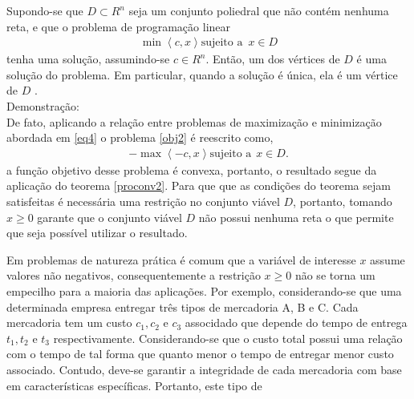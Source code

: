  	\begin{cor}%
	 	\label{cov2}
		Supondo-se que $D \subset R^n$ seja um conjunto poliedral que n\~ao cont\'em nenhuma reta, e que o problema de programa\c c\~ao 
		linear
	   \begin{align} 
		   \label {obj2}
		   \min \left<c,x\right> \mbox{sujeito a} \hspace{6pt}x \in D
	   \end{align}
	    tenha uma solu\c c\~ao, assumindo-se $c \in R^n$. Ent\~ao, um dos v\'ertices de $D$ \'e uma solu\c c\~ao do
		problema. Em particular, quando a solu\c c\~ao \'e \'unica, ela \'e um v\'ertice de $D$ \cite{alexey}.\\
   	   Demonstra\c c\~ao:\\
       De fato, aplicando a rela\c c\~ao entre problemas de maximiza\c c\~ao e minimiza\c c\~ao abordada em \ref{eq4} o problema
	   \ref{obj2} \'e reescrito como,
       \begin{align*}
	   		-\max\left <-c,x \right > \mbox{sujeito a} \hspace{5pt}x \in D.
   		\end{align*}
   		a fun\c c\~ao objetivo desse problema \'e convexa, portanto, o resultado segue da aplica\c c\~ao do
   		teorema \autoref{proconv2}.  
	 Para que que as condi\c c\~oes do teorema sejam satisfeitas \'e necess\'aria uma restri\c c\~ao no conjunto
	 vi\'avel $D$, portanto, tomando $x \geq 0$ garante que o conjunto vi\'avel $D$ n\~ao possui nenhuma reta o que
	 permite que seja poss\'ivel utilizar o resultado.
    \end{cor}
Em problemas de natureza  pr\'atica \'e comum que a vari\'avel de interesse $x$ assume valores n\~ao
negativos, consequentemente a restri\c c\~ao $x \geq 0$ n\~ao se torna um empecilho para a maioria das aplica\c c\~oes.
Por exemplo, considerando-se que uma determinada empresa entregar tr\^es tipos de mercadoria A, B e C. Cada mercadoria
tem um custo $c_1, c_2 \hspace{4pt} \text{e} \hspace{4pt}c_3$ associdado que depende do tempo de entrega 
$t_1,t_2 \hspace{4pt} \text{e} \hspace{4pt}t_3$ respectivamente. Considerando-se que  o custo total possui uma rela\c
c\~ao com o tempo de tal forma que quanto menor o tempo de entregar menor custo associado. Contudo, deve-se garantir a
integridade de cada mercadoria com base em caracter\'isticas espec\'ificas. Portanto, este tipo de
